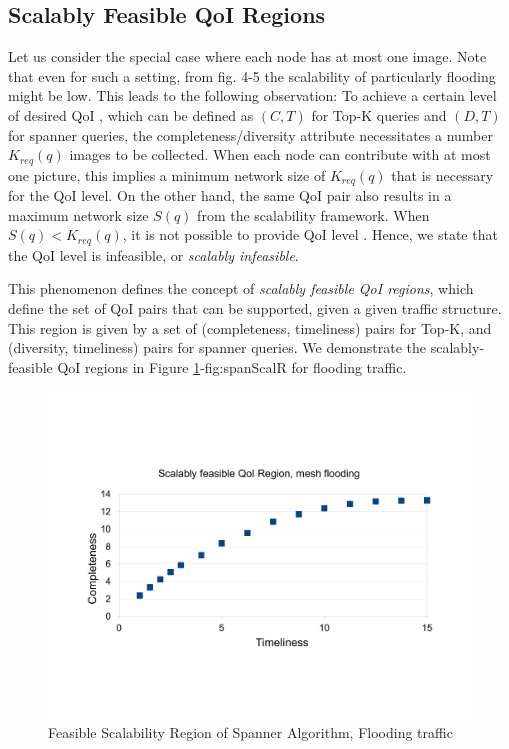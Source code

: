 \subsection{Scalably Feasible QoI Regions}

Let us consider the special case where each node has at most one image. Note that even for such a setting, from fig. 4-5 the scalability of particularly flooding might be low. This leads to the following observation: To achieve a certain level of desired QoI , which can be defined as $(C,T)$ for Top-K queries and $(D,T)$ for spanner queries, the completeness/diversity attribute necessitates a number $K_{req}(q)$ images to be collected. When each node can contribute with at most one picture, this implies a minimum network size of $K_{req}(q)$ that is necessary for the QoI level. On the other hand, the same QoI pair also results in a maximum network size $S(q)$ from the scalability framework.
When $S(q)<K_{req}(q)$, it is not possible to provide QoI level . Hence, we state that the QoI level  is infeasible, or \emph{scalably infeasible}. 

This phenomenon defines the concept of \emph{scalably feasible QoI regions}, which define the set of QoI pairs that can be supported, given a given traffic structure. This region is given by a set of (completeness, timeliness) pairs for Top-K, and (diversity, timeliness) pairs for spanner queries. 
We demonstrate the scalably-feasible QoI regions in Figure \ref{fig:topkScalR}-{fig:spanScalR} for flooding traffic.

\begin{figure}
    \includegraphics[scale=0.35]{figures/topkRegfld.pdf}
    \caption{Feasible Scalability Region of Spanner Algorithm, Flooding traffic}
    \label{fig:topkScalR}
\end{figure}


